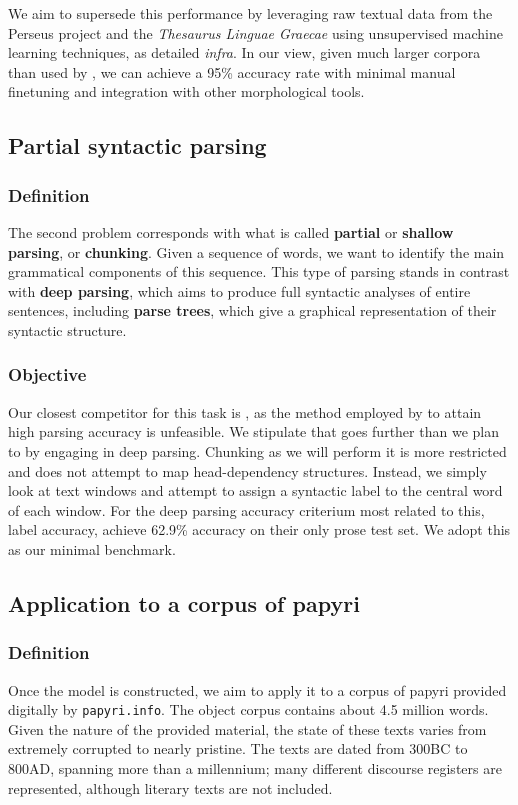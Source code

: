 We aim to supersede this performance by leveraging raw textual data
from the Perseus project and the \textit{Thesaurus Linguae Graecae}
using unsupervised machine learning techniques, as detailed
\textit{infra}. In our view, given much larger corpora than used by
\citeauthor{dik2008}, we can achieve a 95\% accuracy rate with minimal
manual finetuning and integration with other morphological tools.

\subsection{Partial syntactic parsing}
\subsubsection{Definition}
The second problem corresponds with what is called \textbf{partial} or
\textbf{shallow parsing}, or \textbf{chunking}. Given a sequence of
words, we want to identify the main grammatical components of this
sequence.  This type of parsing stands in contrast with \textbf{deep
parsing}, which aims to produce full syntactic analyses of entire
sentences, including \textbf{parse trees}, which give a graphical
representation of their syntactic structure.

\subsubsection{Objective}
Our closest competitor for this task is \cite{mambrini2012}, as 
the method employed by \cite{lee2010dependency} to attain high parsing
accuracy is unfeasible. We stipulate that \cite{mambrini2012} goes
further than we plan to by engaging in deep parsing. Chunking as we
will perform it is more restricted and does not attempt to map
head-dependency structures. Instead, we simply look at text windows
and attempt to assign a syntactic label to the central word of each
window. For the deep parsing accuracy criterium most related to this,
label accuracy, \citeauthor{mambrini2012} achieve 62.9\% accuracy on
their only prose test set. We adopt this as our minimal benchmark.

\subsection{Application to a corpus of papyri}
\subsubsection{Definition}
Once the model is constructed, we aim to apply it to a corpus of
papyri provided digitally by \texttt{papyri.info}. The object corpus
contains about 4.5 million words. Given the nature of the provided
material, the state of these texts varies from extremely corrupted to
nearly pristine. The texts are dated from 300BC to 800AD, spanning
more than a millennium; many different discourse registers are
represented, although literary texts are not included.

